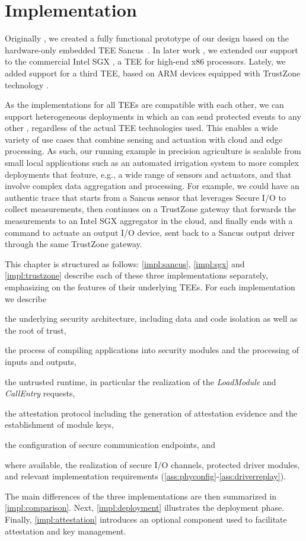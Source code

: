 \section{Implementation}
\label{sec:implementation}
%
Originally \cite{noorman:authentic-execution}, we created a fully functional
prototype of our design based on the hardware-only embedded \ac{TEE}
Sancus~\cite{sancus}. In later work \cite{scopelliti2020thesis}, we extended our
support to the commercial Intel \ac{SGX} \cite{sgx}, a \ac{TEE} for high-end x86
processors. Lately, we added support for a third \ac{TEE}, based on ARM devices
equipped with TrustZone technology \cite{alves:trustzone}.

As the implementations for all \acp{TEE} are compatible with each other, we can
support heterogeneous deployments in which an \protmod{} can send protected
events to any other \protmods{}, regardless of the actual \ac{TEE} technologies
used. This enables a wide variety of use cases that combine sensing and
actuation with cloud and edge processing. As such, our running example in
precision agriculture is scalable from small local applications
such as an automated irrigation system to more complex deployments that
feature, e.g., a wide range of sensors and actuators, and that involve
complex data aggregation and processing. For example, we
could have an authentic trace that starts from a Sancus sensor that leverages
Secure I/O to collect measurements, then continues on a TrustZone gateway
that forwards the measurements to an Intel \ac{SGX} aggregator in the cloud, and
finally ends with a command to actuate an output I/O device, sent back to a
Sancus output driver through the same TrustZone gateway.

This chapter is structured as follows: \cref{impl:sancus}, \ref{impl:sgx} and
\ref{impl:trustzone} describe each of these three implementations separately,
emphasizing on the features of their underlying \acp{TEE}.  For each
implementation we describe
%
\begin{paraenum}
\item the underlying security architecture, including data and code
  isolation as well as the root of trust,
\item the process of compiling applications into security modules and the
  processing of inputs and outputs,
\item the untrusted runtime, in particular the realization of the
  \emph{LoadModule} and \emph{CallEntry} requests,
\item the attestation protocol including the generation of attestation evidence
  and the establishment of module keys,
\item the configuration of secure communication endpoints, and
\item where available, the realization of secure I/O channels, protected
  driver modules, and relevant implementation
  requirements (\ref{ass:phyconfig}-\ref{ass:driverreplay}).
\end{paraenum}
%
The main differences of the three implementations are then summarized in
\cref{impl:comparison}. Next, \cref{impl:deployment} illustrates the
deployment phase. Finally, \cref{impl:attestation} introduces an optional
component used to facilitate attestation and key management.

